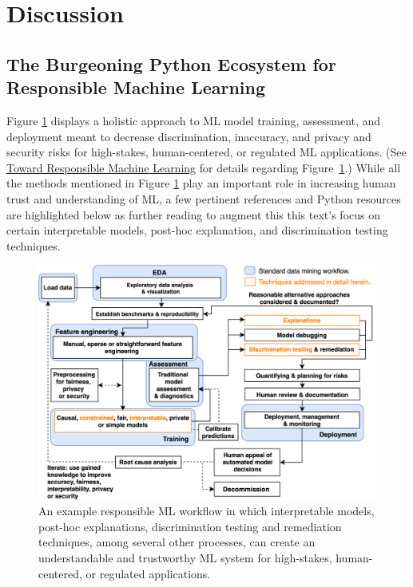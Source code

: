 \documentclass[information,article,accept,moreauthors,pdftex]{Definitions/mdpi}
\begin{document}
\section{Discussion}\label{sec:disc}
\vspace{-6pt}

\subsection{The Burgeoning Python Ecosystem for Responsible Machine Learning}

Figure \ref{fig:blueprint} displays a holistic approach to ML model training, assessment, and deployment meant to decrease discrimination, inaccuracy, and privacy and security risks for high-stakes, human-centered, or regulated ML applications. (See \href{https://github.com/jphall663/hc_ml}{Toward Responsible Machine Learning} for details regarding Figure~\ref{fig:blueprint}.) While all the methods mentioned in Figure \ref{fig:blueprint} play an important role in increasing human trust and understanding of ML, a few pertinent references and Python resources are highlighted below as further reading to augment this this text's focus on certain interpretable models, post-hoc explanation, and discrimination testing techniques.   

\begin{figure}[H]
	\centering
	\includegraphics[width=15cm]{img/blueprint.png}
	\caption{An example responsible ML workflow in which interpretable models, post-hoc explanations, discrimination testing and remediation techniques, among several other processes, can create an understandable and trustworthy ML system for high-stakes, human-centered, or regulated applications.}
	\label{fig:blueprint}
\end{figure} 
\end{document}

